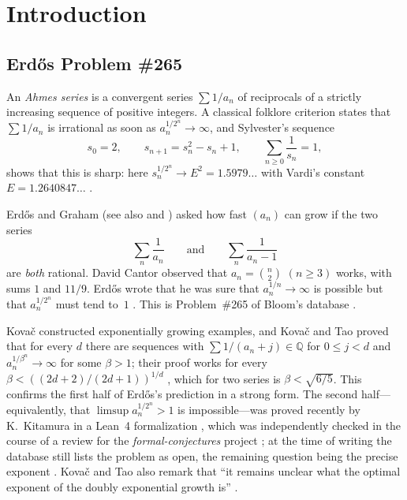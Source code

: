 \documentclass[11pt]{amsart}
\theoremstyle{definition}
\theoremstyle{remark}
\newcommand{\Q}{\mathbb{Q}}
\begin{document}
\section{Introduction}\label{sec:intro}

\subsection{Erd\H{o}s Problem \#265}
An \emph{Ahmes series} is a convergent series $\sum 1/a_n$ of reciprocals of a strictly
increasing sequence of positive integers. A classical folklore criterion states that
$\sum 1/a_n$ is irrational as soon as $a_n^{1/2^n}\to\infty$, and Sylvester's sequence
\begin{equation}\label{eq:sylvester}
s_0=2,\qquad s_{n+1}=s_n^2-s_n+1,\qquad \sum_{n\ge0}\frac1{s_n}=1,
\end{equation}
shows that this is sharp: here $s_n^{1/2^n}\to E^2=1.5979\ldots$ with
Vardi's constant $E=1.2640847\ldots$ \cite{Sylvester1880,Vardi91}.

Erd\H{o}s and Graham \cite[p.~64]{ErGr80} (see also \cite[pp.~104--105]{Er88} and
\cite[p.~334]{Er85}) asked how fast $(a_n)$ can grow if the two series
\[
\sum_n\frac1{a_n}\qquad\text{and}\qquad \sum_n\frac1{a_n-1}
\]
are \emph{both} rational. David Cantor observed that $a_n=\binom n2$ $(n\ge3)$ works,
with sums $1$ and $11/9$. Erd\H{o}s wrote that he was sure that $a_n^{1/n}\to\infty$ is
possible but that $a_n^{1/2^n}$ must tend to~$1$ \cite[pp.~104--105]{Er88}. This is
Problem~\#265 of Bloom's database \cite{Bloom265}.

Kova\v{c} \cite{Kov24} constructed exponentially growing examples, and Kova\v{c} and
Tao \cite{KT25} proved that for every $d$ there are sequences with
$\sum 1/(a_n+j)\in\Q$ for $0\le j<d$ and $a_n^{1/\beta^n}\to\infty$ for some $\beta>1$;
their proof works for every $\beta<((2d+2)/(2d+1))^{1/d}$ \cite[(7.9)]{KT25}, which for
two series is $\beta<\sqrt{6/5}$. This confirms
the first half of Erd\H{o}s's prediction in a strong form. The second half---equivalently,
that $\limsup a_n^{1/2^n}>1$ is impossible---was proved recently by K.~Kitamura in a
Lean~4 formalization \cite{Kit26}, which was independently checked in the course of a
review for the \emph{formal-conjectures} project \cite{FC6839}; at the time of writing
the database still lists the problem as open, the remaining question being the precise
exponent \cite{Bloom265}. Kova\v{c} and Tao also remark that ``it remains unclear what
the optimal exponent of the doubly exponential growth is'' \cite{KT25}.
\end{document}
